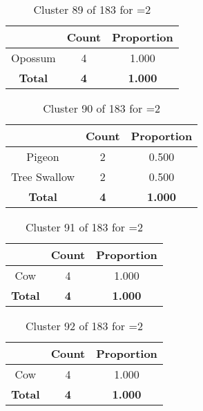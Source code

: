 \begin{table}[ht!]
\centering
\begin{tabular}{|c|c|c|}
\hline
\bf \Spec{} &\bf Count &\bf Proportion\\ \hline \hline
Opossum & 4 & 1.000\\ \hline
\hline
\bf Total & \bf 4 & \bf 1.000\\ \hline
\end{tabular}
\label{tab:cluster:89:2}
\caption{Cluster 89 of 183 for \minneigh{}=2}
\end{table}

\clearpage
\begin{table}[ht!]
\centering
\begin{tabular}{|c|c|c|}
\hline
\bf \Spec{} &\bf Count &\bf Proportion\\ \hline \hline
Pigeon & 2 & 0.500\\ \hline
Tree Swallow & 2 & 0.500\\ \hline
\hline
\bf Total & \bf 4 & \bf 1.000\\ \hline
\end{tabular}
\label{tab:cluster:90:2}
\caption{Cluster 90 of 183 for \minneigh{}=2}
\end{table}

\begin{table}[ht!]
\centering
\begin{tabular}{|c|c|c|}
\hline
\bf \Spec{} &\bf Count &\bf Proportion\\ \hline \hline
Cow & 4 & 1.000\\ \hline
\hline
\bf Total & \bf 4 & \bf 1.000\\ \hline
\end{tabular}
\label{tab:cluster:91:2}
\caption{Cluster 91 of 183 for \minneigh{}=2}
\end{table}

\begin{table}[ht!]
\centering
\begin{tabular}{|c|c|c|}
\hline
\bf \Spec{} &\bf Count &\bf Proportion\\ \hline \hline
Cow & 4 & 1.000\\ \hline
\hline
\bf Total & \bf 4 & \bf 1.000\\ \hline
\end{tabular}
\label{tab:cluster:92:2}
\caption{Cluster 92 of 183 for \minneigh{}=2}
\end{table}

